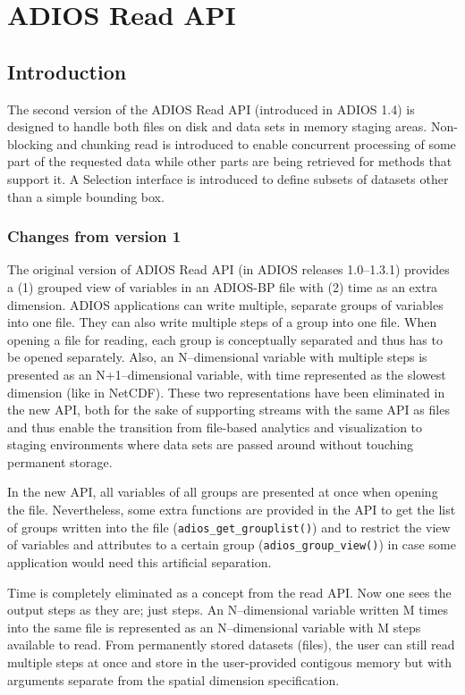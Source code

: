 \chapter{ADIOS Read API}
\label{chapter:read_api}

\section{Introduction}

The second version of the ADIOS Read API (introduced in ADIOS 1.4) is designed to handle both files on disk and data sets in memory staging areas. Non-blocking and chunking read is introduced to enable concurrent processing of some part of the requested data while other parts are being retrieved for methods that support it.  A Selection interface is introduced to define subsets of datasets other than a simple bounding box. 


\subsection{Changes from version 1}
The original version of ADIOS Read API (in ADIOS releases 1.0--1.3.1) provides a (1) grouped view of variables in an ADIOS-BP file with (2) time as an extra dimension. ADIOS applications can write multiple, separate groups of variables into one file. They can also write multiple steps of a group into one file. When opening a file for reading, each group is conceptually separated and thus has to be opened separately. Also, an N--dimensional variable with multiple steps is presented as an N+1--dimensional variable, with time represented as the slowest dimension (like in NetCDF). These two representations have been eliminated in the new API, both for the sake of supporting streams with the same API as files and thus enable the transition from file-based analytics and visualization to staging environments where data sets are passed around without touching permanent storage.

In the new API, all variables of all groups are presented at once when opening the file. Nevertheless, some extra functions are provided in the API to get the list of groups written into the file (\verb+adios_get_grouplist()+) and to restrict the view of variables and attributes to a certain group (\verb+adios_group_view()+) in case some application would need this artificial separation. 

Time is completely eliminated as a concept from the read API. Now one sees the output steps as they are; just steps. An N--dimensional variable written M times into the same file is represented as an N--dimensional variable with M steps available to read. From permanently stored datasets (files), the user can still read multiple steps at once and store in the user-provided contigous memory but with arguments separate from the spatial dimension specification.

